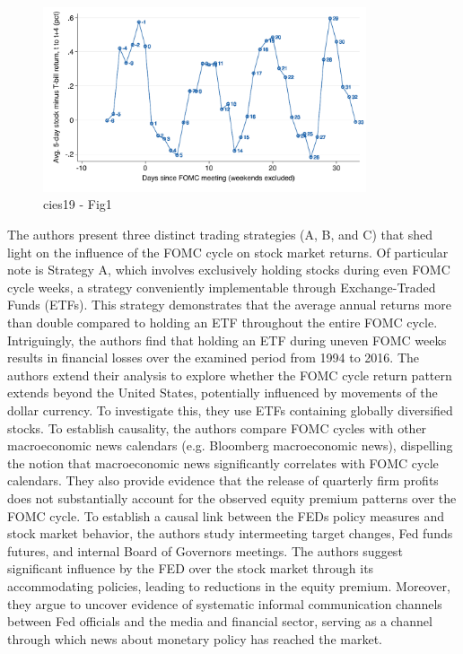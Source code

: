 \begin{figure}[h]
    \centering
    \includegraphics[width=0.85\textwidth]{figures/cies19/fig1}
    \caption{cies19 - Fig1}
\end{figure}


The authors present three distinct trading strategies (A, B, and C) that shed light on the influence of the FOMC cycle on stock market returns. Of particular note is Strategy A, which involves exclusively holding stocks during even FOMC cycle weeks, a strategy conveniently implementable through Exchange-Traded Funds (ETFs). This strategy demonstrates that the average annual returns more than double compared to holding an ETF throughout the entire FOMC cycle. Intriguingly, the authors find that holding an ETF during uneven FOMC weeks results in financial losses over the examined period from 1994 to 2016.
The authors extend their analysis to explore whether the FOMC cycle return pattern extends beyond the United States, potentially influenced by movements of the dollar currency. To investigate this, they use ETFs containing globally diversified stocks. To establish causality, the authors compare FOMC cycles with other macroeconomic news calendars (e.g. Bloomberg macroeconomic news), dispelling the notion that macroeconomic news significantly correlates with FOMC cycle calendars. They also provide evidence that the release of quarterly firm profits does not substantially account for the observed equity premium patterns over the FOMC cycle.
To establish a causal link between the FEDs policy measures and stock market behavior, the authors study intermeeting target changes, Fed funds futures, and internal Board of Governors meetings. 
The authors suggest significant influence by the FED over the stock market through its accommodating policies, leading to reductions in the equity premium. Moreover, they argue to uncover evidence of systematic informal communication channels between Fed officials and the media and financial sector, serving as a channel through which news about monetary policy has reached the market.

